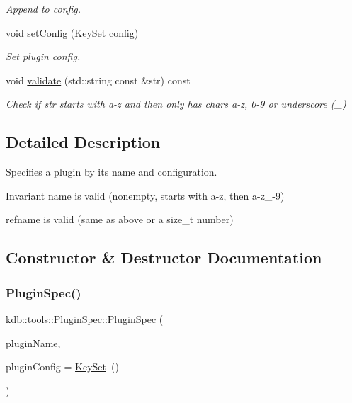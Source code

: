 \begin{DoxyCompactItemize}
\begin{DoxyCompactList}\small\item\em Append to config. \end{DoxyCompactList}\item 
void \hyperlink{classkdb_1_1tools_1_1PluginSpec_a37e6cd12d1f059b64569b86f9a3464a1}{set\+Config} (\hyperlink{classkdb_1_1KeySet}{Key\+Set} config)
\begin{DoxyCompactList}\small\item\em Set plugin config. \end{DoxyCompactList}\item 
void \hyperlink{classkdb_1_1tools_1_1PluginSpec_a26c3e9943430571562ad466ac70ce4d6}{validate} (std\+::string const \&str) const
\begin{DoxyCompactList}\small\item\em Check if str starts with a-\/z and then only has chars a-\/z, 0-\/9 or underscore (\+\_\+) \end{DoxyCompactList}\end{DoxyCompactItemize}


\subsection{Detailed Description}
Specifies a plugin by its name and configuration. 

\begin{DoxyInvariant}{Invariant}
name is valid (nonempty, starts with a-\/z, then a-\/z\+\_-\/9) 

refname is valid (same as above or a size\+\_\+t number) 
\end{DoxyInvariant}


\subsection{Constructor \& Destructor Documentation}
\mbox{\label{classkdb_1_1tools_1_1PluginSpec_a0c327303367f2dbad5ad380dc22bdbee}} 
\subsubsection{\texorpdfstring{Plugin\+Spec()}{PluginSpec()}\hspace{0.1cm}{\footnotesize\ttfamily [1/3]}}
{\footnotesize\ttfamily kdb\+::tools\+::\+Plugin\+Spec\+::\+Plugin\+Spec (\begin{DoxyParamCaption}\item[{std\+::string}]{plugin\+Name,  }\item[{\hyperlink{classkdb_1_1KeySet}{Key\+Set}}]{plugin\+Config = {\ttfamily \hyperlink{classkdb_1_1KeySet}{Key\+Set}~()} }\end{DoxyParamCaption})\hspace{0.3cm}{\ttfamily [explicit]}}




